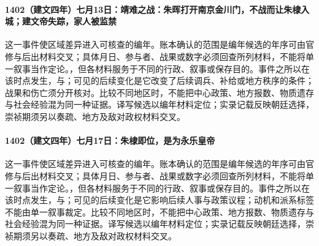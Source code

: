 \paragraph{1402（建文四年）七月13日：靖难之战：朱晖打开南京金川门，不战而让朱棣入城；建文帝失踪，家人被监禁} 这一事件使区域差异进入可核查的编年。账本确认的范围是编年候选的年序可由官修与后出材料交叉；具体月日、参与者、战果或数字必须回查所列材料，不能将单一叙事当作定论。，但各材料服务于不同的行政、叙事或保存目的。事件之所以在该时点发生，与；可见的后续变化是它改变了后续调兵、补给或地方秩序的条件；战果和伤亡须分开核对。比较不同地区时，不能把中心政策、地方报数、物质遗存与社会经验混为同一种证据。译写候选以编年材料定位；实录记载反映朝廷选择，崇祯期须另以奏疏、地方及敌对政权材料交叉。

\paragraph{1402（建文四年）七月17日：朱棣即位，是为永乐皇帝} 这一事件使区域差异进入可核查的编年。账本确认的范围是编年候选的年序可由官修与后出材料交叉；具体月日、参与者、战果或数字必须回查所列材料，不能将单一叙事当作定论。，但各材料服务于不同的行政、叙事或保存目的。事件之所以在该时点发生，与；可见的后续变化是它影响后续人事与政策议程；动机和派系标签不能由单一叙事裁定。比较不同地区时，不能把中心政策、地方报数、物质遗存与社会经验混为同一种证据。译写候选以编年材料定位；实录记载反映朝廷选择，崇祯期须另以奏疏、地方及敌对政权材料交叉。
